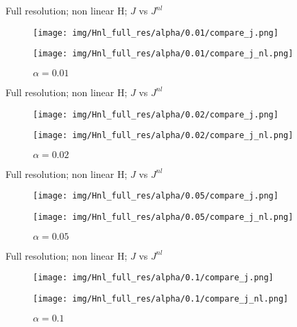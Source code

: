 \documentclass[francais]{beamer}
\begin{document}
\begin{frame}{Full resolution; non linear H; $J$ vs $J^{nl}$}
\begin{center}
\begin{figure}
  \texttt{[image: img/Hnl\_full\_res/alpha/0.01/compare\_j.png]}
  \caption{$\alpha = 0.01$}
\endminipage\hfill
{}
  \texttt{[image: img/Hnl\_full\_res/alpha/0.01/compare\_j\_nl.png]}
  \caption{$\alpha = 0.01$}
\endminipage
\end{figure}
\end{center}
\end{frame}

\begin{frame}{Full resolution; non linear H; $J$ vs $J^{nl}$}
\begin{center}
\begin{figure}
  \texttt{[image: img/Hnl\_full\_res/alpha/0.02/compare\_j.png]}
  \caption{$\alpha = 0.02$}
\endminipage\hfill
{}
  \texttt{[image: img/Hnl\_full\_res/alpha/0.02/compare\_j\_nl.png]}
  \caption{$\alpha = 0.02$}
\endminipage
\end{figure}
\end{center}
\end{frame}

\begin{frame}{Full resolution; non linear H; $J$ vs $J^{nl}$}
\begin{center}
\begin{figure}
  \texttt{[image: img/Hnl\_full\_res/alpha/0.05/compare\_j.png]}
  \caption{$\alpha = 0.05$}
\endminipage\hfill
{}
  \texttt{[image: img/Hnl\_full\_res/alpha/0.05/compare\_j\_nl.png]}
  \caption{$\alpha = 0.05$}
\endminipage
\end{figure}
\end{center}
\end{frame}

\begin{frame}{Full resolution; non linear H; $J$ vs $J^{nl}$}
\begin{center}
\begin{figure}
  \texttt{[image: img/Hnl\_full\_res/alpha/0.1/compare\_j.png]}
  \caption{$\alpha = 0.1$}
\endminipage\hfill
{}
  \texttt{[image: img/Hnl\_full\_res/alpha/0.1/compare\_j\_nl.png]}
  \caption{$\alpha = 0.1$}
\endminipage
\end{figure}
\end{center}
\end{frame}
\end{document}
